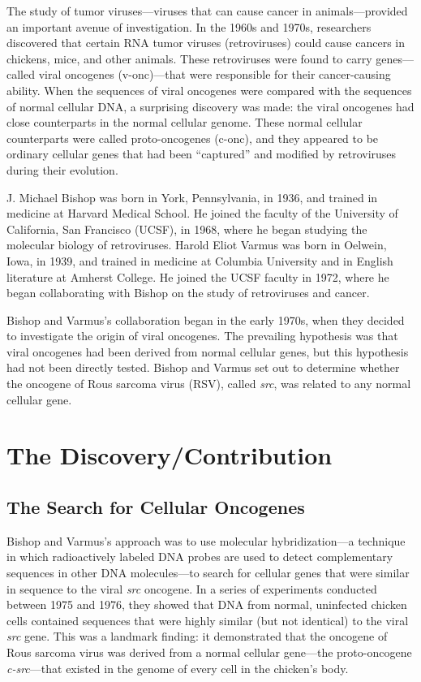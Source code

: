 The study of tumor viruses---viruses that can cause cancer in animals---provided an important avenue of investigation. In the 1960s and 1970s, researchers discovered that certain RNA tumor viruses (retroviruses) could cause cancers in chickens, mice, and other animals. These retroviruses were found to carry genes---called viral oncogenes (v-onc)---that were responsible for their cancer-causing ability. When the sequences of viral oncogenes were compared with the sequences of normal cellular DNA, a surprising discovery was made: the viral oncogenes had close counterparts in the normal cellular genome. These normal cellular counterparts were called proto-oncogenes (c-onc), and they appeared to be ordinary cellular genes that had been ``captured'' and modified by retroviruses during their evolution.

J. Michael Bishop was born in York, Pennsylvania, in 1936, and trained in medicine at Harvard Medical School. He joined the faculty of the University of California, San Francisco (UCSF), in 1968, where he began studying the molecular biology of retroviruses. Harold Eliot Varmus was born in Oelwein, Iowa, in 1939, and trained in medicine at Columbia University and in English literature at Amherst College. He joined the UCSF faculty in 1972, where he began collaborating with Bishop on the study of retroviruses and cancer.

Bishop and Varmus's collaboration began in the early 1970s, when they decided to investigate the origin of viral oncogenes. The prevailing hypothesis was that viral oncogenes had been derived from normal cellular genes, but this hypothesis had not been directly tested. Bishop and Varmus set out to determine whether the oncogene of Rous sarcoma virus (RSV), called \emph{src}, was related to any normal cellular gene.

\section{The Discovery/Contribution}

\subsection{The Search for Cellular Oncogenes}

Bishop and Varmus's approach was to use molecular hybridization---a technique in which radioactively labeled DNA probes are used to detect complementary sequences in other DNA molecules---to search for cellular genes that were similar in sequence to the viral \emph{src} oncogene. In a series of experiments conducted between 1975 and 1976, they showed that DNA from normal, uninfected chicken cells contained sequences that were highly similar (but not identical) to the viral \emph{src} gene. This was a landmark finding: it demonstrated that the oncogene of Rous sarcoma virus was derived from a normal cellular gene---the proto-oncogene \emph{c-src}---that existed in the genome of every cell in the chicken's body.

